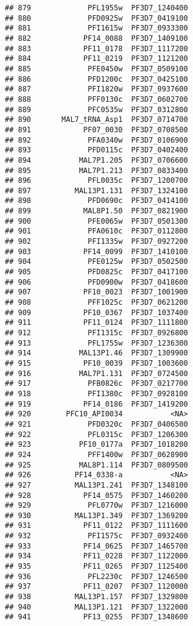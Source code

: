 \documentclass{article}\usepackage[]{graphicx}\usepackage[]{color}
\makeatletter
\newenvironment{kframe}{%
 \def\at@end@of@kframe{}%
 \ifinner\ifhmode%
  \def\at@end@of@kframe{\end{minipage}}%
  \begin{minipage}{\columnwidth}%
 \fi\fi%
 \def\FrameCommand##1{\hskip\@totalleftmargin \hskip-\fboxsep
 \colorbox{shadecolor}{##1}\hskip-\fboxsep
     \hskip-\linewidth \hskip-\@totalleftmargin \hskip\columnwidth}%
 \MakeFramed {\advance\hsize-\width
   \@totalleftmargin\z@ \linewidth\hsize
   \@setminipage}}%
 {\par\unskip\endMakeFramed%
 \at@end@of@kframe}
\newenvironment{knitrout}{}{} %
\makeatother
\begin{document}
\begin{knitrout}
\begin{kframe}
\begin{verbatim}
## 879             PFL1955w  PF3D7_1240400
## 880             PFD0925w  PF3D7_0419100
## 881             PFI1615w  PF3D7_0933300
## 882            PF14_0088  PF3D7_1409100
## 883            PF11_0178  PF3D7_1117200
## 884            PF11_0219  PF3D7_1121200
## 885             PFE0450w  PF3D7_0509100
## 886             PFD1200c  PF3D7_0425100
## 887             PFI1820w  PF3D7_0937600
## 888             PFF0130c  PF3D7_0602700
## 889             PFC0535w  PF3D7_0312800
## 890       MAL7_tRNA_Asp1  PF3D7_0714700
## 891            PF07_0030  PF3D7_0708500
## 892             PFA0340w  PF3D7_0106900
## 893             PFD0115c  PF3D7_0402400
## 894           MAL7P1.205  PF3D7_0706600
## 895           MAL7P1.213  PF3D7_0833400
## 896             PFL0035c  PF3D7_1200700
## 897          MAL13P1.131  PF3D7_1324100
## 898             PFD0690c  PF3D7_0414100
## 899            MAL8P1.50  PF3D7_0821900
## 900             PFE0065w  PF3D7_0501300
## 901             PFA0610c  PF3D7_0112800
## 902             PFI1335w  PF3D7_0927200
## 903            PF14_0099  PF3D7_1410100
## 904             PFE0125w  PF3D7_0502500
## 905             PFD0825c  PF3D7_0417100
## 906             PFD0900w  PF3D7_0418600
## 907            PF10_0023  PF3D7_1001900
## 908             PFF1025c  PF3D7_0621200
## 909            PF10_0367  PF3D7_1037400
## 911            PF11_0124  PF3D7_1111800
## 912             PFI1315c  PF3D7_0926800
## 913             PFL1755w  PF3D7_1236300
## 914           MAL13P1.46  PF3D7_1309900
## 915            PF10_0039  PF3D7_1003600
## 916           MAL7P1.131  PF3D7_0724500
## 917             PFB0826c  PF3D7_0217700
## 918             PFI1380c  PF3D7_0928100
## 919            PF14_0186  PF3D7_1419200
## 920        PFC10_API0034           <NA>
## 921             PFD0320c  PF3D7_0406500
## 922             PFL0315c  PF3D7_1206300
## 923           PF10_0177a  PF3D7_1018200
## 924             PFF1400w  PF3D7_0628900
## 925           MAL8P1.114  PF3D7_0809500
## 926          PF14_0338-a           <NA>
## 927          MAL13P1.241  PF3D7_1348100
## 928            PF14_0575  PF3D7_1460200
## 929             PFL0770w  PF3D7_1216000
## 930          MAL13P1.349  PF3D7_1369200
## 931            PF11_0122  PF3D7_1111600
## 932             PFI1575c  PF3D7_0932400
## 933            PF14_0625  PF3D7_1465700
## 934            PF11_0228  PF3D7_1122000
## 935            PF11_0265  PF3D7_1125400
## 936             PFL2230c  PF3D7_1246500
## 937            PF11_0207  PF3D7_1120000
## 938          MAL13P1.157  PF3D7_1329800
## 940          MAL13P1.121  PF3D7_1322000
## 941            PF13_0255  PF3D7_1348600

\end{verbatim}
\end{kframe}
\end{knitrout}
\end{document}
